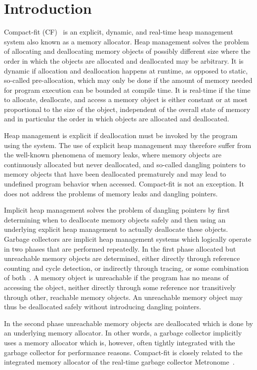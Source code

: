 \documentclass{amsart}
\begin{document}
\section{Introduction}
\label{sec:intro}

Compact-fit (CF)~\cite{USENIX08} is an explicit, dynamic, and real-time
heap management system also known as a memory allocator.  Heap
management solves the problem of allocating and deallocating memory
objects of possibly different size where the order in which the
objects are allocated and deallocated may be arbitrary.  It is dynamic
if allocation and deallocation happens at runtime, as opposed to
static, so-called pre-allocation, which may only be done if the
amount of memory needed for program execution can be bounded at
compile time.  It is real-time if the time to allocate, deallocate,
and access a memory object is either constant or at most proportional
to the size of the object, independent of the overall state of memory
and in particular the order in which objects are allocated and
deallocated.

Heap management is explicit if deallocation must be invoked by the
program using the system.  The use of explicit heap management may
therefore suffer from the well-known phenomena of memory leaks, where
memory objects are continuously allocated but never deallocated, and
so-called dangling pointers to memory objects that have been
deallocated prematurely and may lead to undefined program behavior
when accessed.  Compact-fit is not an exception.  It does not address
the problems of memory leaks and dangling pointers.

Implicit heap management solves the problem of dangling pointers by
first determining when to deallocate memory objects safely and then
using an underlying explicit heap management to actually deallocate
these objects.  Garbage collectors are implicit heap management
systems which logically operate in two phases that are performed
repeatedly.  In the first phase allocated but unreachable memory
objects are determined, either directly through reference counting and
cycle detection, or indirectly through tracing, or some combination of
both~\cite{Bac4}.  A memory object is unreachable if the program has
no means of accessing the object, neither directly through some
reference nor transitively through other, reachable memory objects.
An unreachable memory object may thus be deallocated safely without
introducing dangling pointers.

In the second phase unreachable memory objects are deallocated which
is done by an underlying memory allocator.  In other words, a garbage
collector implicitly uses a memory allocator which is, however, often
tightly integrated with the garbage collector for performance reasons.
Compact-fit is closely related to the integrated memory allocator of
the real-time garbage collector Metronome~\cite{Bac2}.
\end{document}

